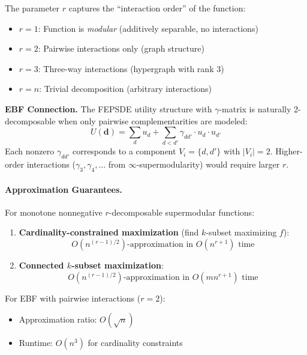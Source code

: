 The parameter $r$ captures the ``interaction order'' of the function:
\begin{itemize}
    \item $r = 1$: Function is \emph{modular} (additively separable, no interactions)
    \item $r = 2$: Pairwise interactions only (graph structure)
    \item $r = 3$: Three-way interactions (hypergraph with rank 3)
    \item $r = n$: Trivial decomposition (arbitrary interactions)
\end{itemize}

\textbf{EBF Connection.} The FEPSDE utility structure with $\gamma$-matrix is 
naturally 2-decomposable when only pairwise complementarities are modeled:
\begin{equation}
U(\mathbf{d}) = \sum_{d} u_d + \sum_{d < d'} \gamma_{dd'} \cdot u_d \cdot u_{d'}
\end{equation}
Each nonzero $\gamma_{dd'}$ corresponds to a component $V_i = \{d, d'\}$ with 
$|V_i| = 2$. Higher-order interactions ($\gamma_3, \gamma_4, \ldots$ from 
$\infty$-supermodularity) would require larger $r$.

\paragraph{Approximation Guarantees.}

\begin{theorem}[Chen et al. 2025]
\label{thm:chen-approx}
For monotone nonnegative $r$-decomposable supermodular functions:
\begin{enumerate}
    \item \textbf{Cardinality-constrained maximization} (find $k$-subset maximizing $f$):
    \[
    O(n^{(r-1)/2})\text{-approximation in } O(n^{r+1}) \text{ time}
    \]
    \item \textbf{Connected $k$-subset maximization}:
    \[
    O(n^{(r-1)/2})\text{-approximation in } O(mn^{r+1}) \text{ time}
    \]
\end{enumerate}
\end{theorem}

For EBF with pairwise interactions ($r = 2$):
\begin{itemize}
    \item Approximation ratio: $O(\sqrt{n})$
    \item Runtime: $O(n^3)$ for cardinality constraints
\end{itemize}

